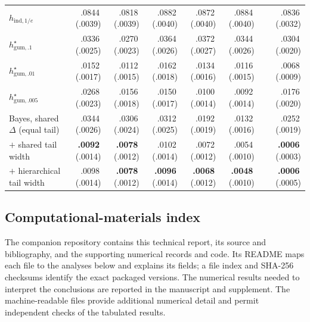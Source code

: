 \documentclass[11pt]{article}
\newcommand{\mcse}[2]{\mbox{#1\,{\fontsize{7}{8}\selectfont(#2)}}}
\newcommand{\bestmcse}[2]{\mbox{\textbf{#1}\,{\fontsize{7}{8}\selectfont(#2)}}}
\begin{document}
\begin{table}[htbp]
\begin{tabular}{@{}lrrrrrcr@{}}
$h_{\mathrm{ind},1/e}$ & \mcse{.0844}{.0039} & \mcse{.0818}{.0039} & \mcse{.0882}{.0040} & \mcse{.0872}{.0040} & \mcse{.0884}{.0040} & & \mcse{.0836}{.0032} \\
$h^\star_{\mathrm{gum},.1}$ & \mcse{.0336}{.0025} & \mcse{.0270}{.0023} & \mcse{.0364}{.0026} & \mcse{.0372}{.0027} & \mcse{.0344}{.0026} & & \mcse{.0304}{.0020} \\
$h^\star_{\mathrm{gum},.01}$ & \mcse{.0152}{.0017} & \mcse{.0112}{.0015} & \mcse{.0162}{.0018} & \mcse{.0134}{.0016} & \mcse{.0116}{.0015} & & \mcse{.0068}{.0009} \\
$h^\star_{\mathrm{gum},.005}$ & \mcse{.0268}{.0023} & \mcse{.0156}{.0018} & \mcse{.0150}{.0017} & \mcse{.0100}{.0014} & \mcse{.0092}{.0014} & & \mcse{.0176}{.0020} \\
Bayes, shared $\Delta$ (equal tail) & \mcse{.0344}{.0026} & \mcse{.0306}{.0024} & \mcse{.0312}{.0025} & \mcse{.0192}{.0019} & \mcse{.0132}{.0016} & & \mcse{.0252}{.0019} \\
\quad $+$ shared tail width & \bestmcse{.0092}{.0014} & \bestmcse{.0078}{.0012} & \mcse{.0102}{.0014} & \mcse{.0072}{.0012} & \mcse{.0054}{.0010} & & \bestmcse{.0006}{.0003} \\
\quad $+$ hierarchical tail width & \mcse{.0098}{.0014} & \bestmcse{.0078}{.0012} & \bestmcse{.0096}{.0014} & \bestmcse{.0068}{.0012} & \bestmcse{.0048}{.0010} & & \bestmcse{.0006}{.0005} \\
\bottomrule
\end{tabular}
\end{table}

\clearpage
\subsection{Computational-materials index}
\label{sec:computational-materials}

\begingroup
\small
\raggedright
The companion repository contains this technical report, its source and
bibliography, and the supporting numerical records and code.  Its README maps each file to the analyses below and explains
its fields; a file index and SHA-256 checksums identify the exact packaged
versions.  The numerical results needed to interpret the conclusions are
reported in the manuscript and supplement.  The machine-readable files provide
additional numerical detail and permit independent checks of the tabulated
results.
\end{document}
